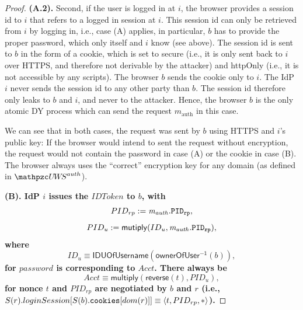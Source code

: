 \begin{proof}
    \textbf{(A.2).} Second, if the user is logged in at $i$, the 
    browser provides a session id to $i$ that refers to a 
    logged in session at $i$. This session id can only be 
    retrieved from $i$ by logging in, i.e., case (A) applies, 
    in particular, $b$ has to provide the proper password, 
    which only itself and $i$ know (see above). The session id 
    is sent to $b$ in the form of a cookie, which is set to 
    secure (i.e., it is only sent back to $i$ over HTTPS, and
    therefore not derivable by the attacker) and httpOnly 
    (i.e., it is not accessible by any scripts). The browser $b$ 
    sends the cookie only to $i$. The IdP $i$ never sends the 
    session id to any other party than $b$. The session id 
    therefore only leaks to $b$ and $i$, and never to the 
    attacker. Hence, the browser $b$ is the only atomic DY 
    process which can send the request $m_\text{auth}$ in this case.
  
    We can see that in both cases, the request was sent by $b$ 
    using HTTPS and $i$'s public key: If the browser would 
    intend to sent the request without encryption, the request 
    would not contain the password in case (A) or the cookie in 
    case (B). The browser always uses the ``correct'' encryption 
    key for any domain (as defined in $\uppressoauthwebsystem$).
  
	\textbf{(B). IdP $i$ issues the $IDToken$ to $b$, with
    $$ PID_{rp} := \mathit{m_{auth}.\mathtt{PID_{rp}}}, $$ 
    $$ PID_u := \mathsf{mutiply}(ID_u, \mathit{m_{auth}.\mathtt{PID_{rp}}}), $$ 
    where 
    $$ ID_u \equiv \mathsf{IDUOfUsername} (\mathsf{ownerOfUser^{-1}}(b)), $$ 
    for $password$ is corresponding to $Acct$. There always be
	$$ Acct \equiv \mathsf{multiply}(\mathsf{reverse}(t), PID_u),$$
	for nonce $t$ and $PID_{rp}$ are negotiated by $b$ and $r$ (i.e., $S(r).loginSession[S(b).\mathtt{cookies}[dom(r)]] \equiv \langle t, PID_{rp}, *\rangle$).    
    }
    

\end{proof}
